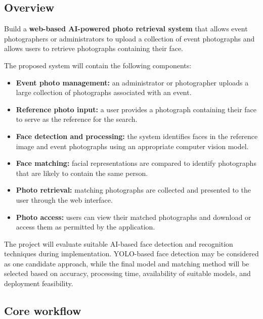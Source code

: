 \documentclass[11pt,a4paper]{article}
\begin{document}
\subsection{Overview}

Build a \textbf{web-based AI-powered photo retrieval system} that allows
event photographers or administrators to upload a collection of event
photographs and allows users to retrieve photographs containing their
face.

The proposed system will contain the following components:

\begin{itemize}[leftmargin=0.7cm]
    \item \textbf{Event photo management:} an administrator or
    photographer uploads a large collection of photographs associated
    with an event.

    \item \textbf{Reference photo input:} a user provides a photograph
    containing their face to serve as the reference for the search.

    \item \textbf{Face detection and processing:} the system identifies
    faces in the reference image and event photographs using an
    appropriate computer vision model.

    \item \textbf{Face matching:} facial representations are compared
    to identify photographs that are likely to contain the same person.

    \item \textbf{Photo retrieval:} matching photographs are collected
    and presented to the user through the web interface.

    \item \textbf{Photo access:} users can view their matched
    photographs and download or access them as permitted by the
    application.
\end{itemize}

The project will evaluate suitable AI-based face detection and
recognition techniques during implementation. YOLO-based face detection
may be considered as one candidate approach, while the final model and
matching method will be selected based on accuracy, processing time,
availability of suitable models, and deployment feasibility.

\subsection{Core workflow}
\end{document}
